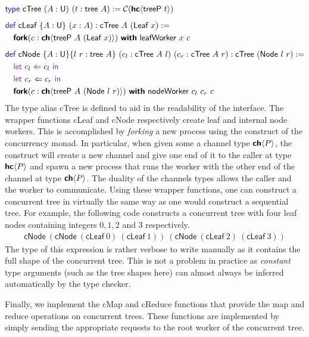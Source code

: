 \vspace{-1em}
\begingroup
\small
\addtolength{\jot}{-0.2em}
\begin{align*}
  &\Type\ \textsf{cTree}\ (A : \Un)\ (t : \textsf{tree}\ A) := \CM{\HC{\textsf{treeP}\ t}}
  \\[0.5em]
  &\Def\ \textsf{cLeaf}\ \{A : \Un\}\ (x : A) : \textsf{cTree}\ A\ (\textsf{Leaf}\ x) := \\
  &\quad\Fork(c : \CH{\textsf{treeP}\ A\ (\textsf{Leaf}\ x)})\ \With\ \textsf{leafWorker}\ x\ c
  \\[0.5em]
  &\Def\ \textsf{cNode}\ \{A : \Un\} \{l\ r : \textsf{tree}\ A\}\ (c_l : \textsf{cTree}\ A\ l)\ (c_r : \textsf{cTree}\ A\ r) : \textsf{cTree}\ (\textsf{Node}\ l\ r) := \\
  &\quad\Let\ c_l \Leftarrow c_l\ \In \\
  &\quad\Let\ c_r \Leftarrow c_r\ \In \\
  &\quad\Fork(c : \CH{\textsf{treeP}\ A\ (\textsf{Node}\ l\ r)})\ \With\ \textsf{nodeWorker}\ c_l\ c_r\ c
\end{align*}
\endgroup
The type alias \textsf{cTree} is defined to aid in the readability of the interface.
The wrapper functions \textsf{cLeaf} and \textsf{cNode} respectively create leaf
and internal node workers. This is accomplished by \emph{forking} a new process using
the \Fork{} construct of the concurrency monad. In particular, when given some a channel type
${\textbf{\textsf{ch}}\langle{P}\rangle}$, the \Fork{} construct will create a new channel and give one end of it to the caller
at type ${\textbf{\textsf{hc}}\langle{P}\rangle}$ and spawn a new process that runs the worker with the other end of the channel
at type ${\textbf{\textsf{ch}}\langle{P}\rangle}$. The duality of the channels types allows the caller and the worker to communicate.
Using these wrapper functions, one can construct a concurrent tree in virtually the same way
as one would construct a sequential tree. For example, the following code constructs a
concurrent tree with four leaf nodes containing integers $0, 1, 2$ and
$3$ respectively.
\begin{align*}
  \textsf{cNode}\ (\textsf{cNode}\ (\textsf{cLeaf}\ 0)\ (\textsf{cLeaf}\ 1))\ (\textsf{cNode}\ (\textsf{cLeaf}\ 2)\ (\textsf{cLeaf}\ 3))
\end{align*}
The type of this expression is rather verbose to write manually as it contains the full shape
of the concurrent tree. This is not a problem in practice as \emph{constant} type arguments
(such as the tree shapes here) can almost always be inferred automatically by the type checker.

Finally, we implement the \textsf{cMap} and \textsf{cReduce} functions that provide the
map and reduce operations on concurrent trees. These functions are implemented by
simply sending the appropriate requests to the root worker of the concurrent tree.

